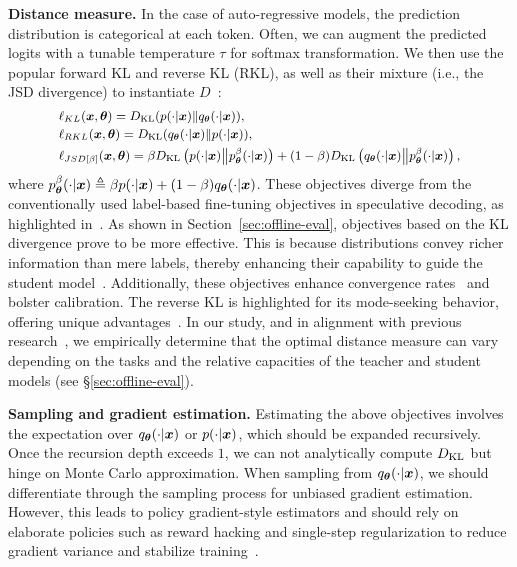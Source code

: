 \textbf{Distance measure.} 
In the case of auto-regressive models, the prediction distribution is categorical at each token. 
Often, we can augment the predicted logits with a tunable temperature $\tau$ for softmax transformation. 
We then use the popular forward KL and reverse KL (RKL), as well as their mixture (i.e., the JSD divergence) 
to instantiate $D$~\citep{agarwal2023gkd,gu2023knowledge}:
\begin{equation}
    \small
    \begin{aligned}
        &\ell_{KL}(\vx, \vtheta) = \KL( {p(\cdot|\vx)}\Vert {q_\vtheta(\cdot|\vx)}), \\
        &\ell_{RKL}(\vx, \vtheta) = \KL({q_\vtheta(\cdot|\vx)} \Vert {p(\cdot|\vx)}), \\
        &\ell_{{JSD}[\beta]} (\vx, \vtheta) = \beta \KL \left({p(\cdot|\vx)} \big\Vert {p}^\beta_\vtheta(\cdot|\vx)\right)+ (1-\beta) \KL \left({q_\vtheta(\cdot|\vx)} \big\Vert {p}^\beta_\vtheta(\cdot|\vx)\right),
    \end{aligned}
\end{equation}
where ${p}^\beta_{\bm{\theta}}(\cdot|{\bm{x}}) \triangleq \beta{p(\cdot|{\bm{x}})} + (1-\beta){q_{\bm{\theta}}(\cdot|{\bm{x}})}$. 
These objectives diverge from the conventionally used label-based fine-tuning objectives in speculative decoding, 
as highlighted in~\citep{miao2023specinfer, leviathan2023fast}. As shown in Section~\ref{sec:offline-eval},
objectives based on the KL divergence prove to be more effective. This is because distributions 
convey richer information than mere labels, thereby enhancing their capability to guide the student model~\citep{hinton2015distilling}. 
Additionally, these objectives enhance convergence rates~\citep{he2022knowledge} and bolster calibration. 
The reverse KL is highlighted for its mode-seeking behavior, offering unique advantages~\citep{gu2023knowledge}. 
In our study, and in alignment with previous research~\citep{agarwal2023gkd}, we empirically determine that the optimal 
distance measure can vary depending on the tasks and the relative capacities of the teacher and student models (see \S\ref{sec:offline-eval}).


\textbf{Sampling and gradient estimation.}
Estimating the above objectives involves the expectation over $q_{\bm{\theta}}(\cdot|{\bm{x}})$ or $p(\cdot|{\bm{x}})$, which should be expanded recursively. 
Once the recursion depth exceeds $1$, we can not analytically compute $D_{\mathrm{KL}}$ but hinge on Monte Carlo approximation. 
When sampling from $q_{\bm{\theta}}(\cdot|{\bm{x}})$, we should differentiate through the sampling process for unbiased gradient estimation. 
However, this leads to policy gradient-style estimators and should rely on elaborate policies such as reward hacking and single-step regularization to reduce gradient variance and stabilize training~\citep{gu2023knowledge}. 

